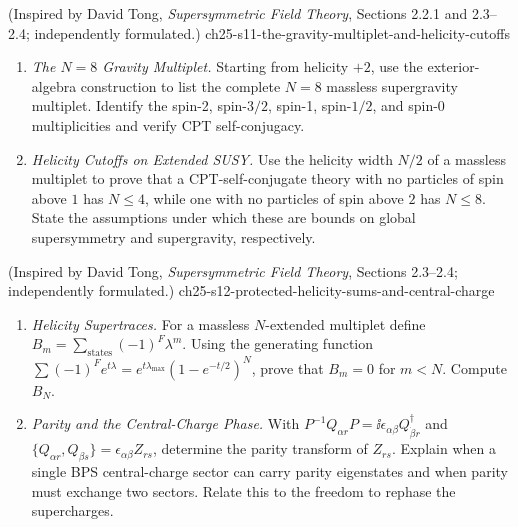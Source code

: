 \begin{enumerate}
    {(Inspired by David Tong, \emph{Supersymmetric Field Theory}, Sections 2.2.1 and 2.3--2.4; independently formulated.)}
    {ch25-s11-the-gravity-multiplet-and-helicity-cutoffs}
  \begin{enumerate}
    \item \emph{The \(N=8\) Gravity Multiplet.}
    Starting from helicity \(+2\), use the exterior-algebra construction to
      list the complete \(N=8\) massless supergravity multiplet.  Identify the
      spin-2, spin-\(3/2\), spin-1, spin-\(1/2\), and spin-0 multiplicities and
      verify CPT self-conjugacy.
    \item \emph{Helicity Cutoffs on Extended SUSY.}
    Use the helicity width \(N/2\) of a massless multiplet to prove that a
      CPT-self-conjugate theory with no particles of spin above \(1\) has
      \(N\leq4\), while one with no particles of spin above \(2\) has
      \(N\leq8\).  State the assumptions under which these are bounds on global
      supersymmetry and supergravity, respectively.
  \end{enumerate}

    {(Inspired by David Tong, \emph{Supersymmetric Field Theory}, Sections 2.3--2.4; independently formulated.)}
    {ch25-s12-protected-helicity-sums-and-central-charge}
  \begin{enumerate}
    \item \emph{Helicity Supertraces.}
    For a massless \(N\)-extended multiplet define
      \(B_m=\sum_{\text{states}}(-1)^F\lambda^m\).
      Using the generating function
      \(\sum(-1)^F e^{t\lambda}
      =e^{t\lambda_{\max}}(1-e^{-t/2})^N\), prove that
      \(B_m=0\) for \(m<N\).  Compute \(B_N\).
    \item \emph{Parity and the Central-Charge Phase.}
    With
      \(P^{-1}Q_{\alpha r}P=\ii\epsilon_{\alpha\beta}
      Q^\dagger_{\dot\beta r}\) and
      \(\{Q_{\alpha r},Q_{\beta s}\}
      =\epsilon_{\alpha\beta}Z_{rs}\), determine the parity transform of
      \(Z_{rs}\).  Explain when a single BPS central-charge sector can carry
      parity eigenstates and when parity must exchange two sectors.  Relate this
      to the freedom to rephase the supercharges.
  \end{enumerate}

\end{enumerate}
